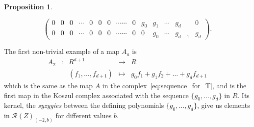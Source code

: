 \documentclass[a4paper,11pt]{amsart}
\theoremstyle{plain}
\newtheorem{proposition}[theorem]{Proposition}
\theoremstyle{definition}
\newcommand{\R}{\mathcal{R}}
\begin{document}
\begin{proposition}
\begin{enumerate}
\begin{equation*}
\begin{pmatrix}
            0 & 0 & 0 & \cdots & 0 & 0 & 0 & \cdots \cdots & 0 & g_0 & g_1 & \cdots & g_d & 0 \\
            0 & 0 & 0 & \cdots & 0 & 0 & 0 & \cdots \cdots & 0 & 0 & g_0 & \cdots & g_{d-1} & g_d
        \end{pmatrix}.
    \end{equation*}
\end{enumerate}
\end{proposition}

The first non-trivial example of a map $A_a$ is
\begin{equation*}\begin{array}{rcccl}
    A_2 & \colon & R^{d+1} & \longrightarrow & R \\
     && (f_1, \ldots, f_{d+1}) & \mapsto & g_0 f_{1} + g_1 f_{2} + \ldots + g_d f_{d+1}
\end{array}     
\end{equation*}
which is the same as the map $A$ in the complex~\eqref{eq:sequence_for_T}, and is the first map in the Koszul complex associated with the sequence $\{g_0, \dots, g_d\}$ in $R$. Its kernel, the {\em syzygies} between the defining polynomials $\{g_0, \dots, g_d\}$, give us elements in $\R(Z)_{(-2,b)}$ for different values $b$. %
\end{document}
